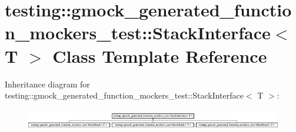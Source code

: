 \hypertarget{classtesting_1_1gmock__generated__function__mockers__test_1_1_stack_interface}{}\section{testing\+::gmock\+\_\+generated\+\_\+function\+\_\+mockers\+\_\+test\+::Stack\+Interface$<$ T $>$ Class Template Reference}
\label{classtesting_1_1gmock__generated__function__mockers__test_1_1_stack_interface}
Inheritance diagram for testing\+::gmock\+\_\+generated\+\_\+function\+\_\+mockers\+\_\+test\+::Stack\+Interface$<$ T $>$\+:\begin{figure}[H]
\begin{center}
\leavevmode
\includegraphics[height=0.906149cm]{da/d56/classtesting_1_1gmock__generated__function__mockers__test_1_1_stack_interface}
\end{center}
\end{figure}
